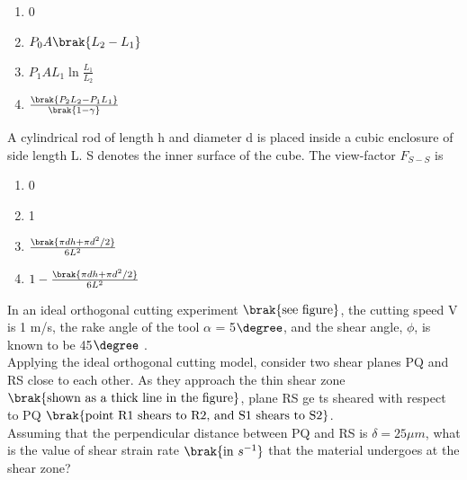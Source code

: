 		\begin{enumerate}
			\item 0
			\item $P_0A\brak{L_2 - L_1}$
			\item $P_1AL_1\ln\frac{L_1}{L_2}$
			\item $\frac{\brak{P_2L_2 - P_1L_1}}{\brak{1 - \gamma}}$
		\end{enumerate}
\item A cylindrical rod of length h and diameter d is placed inside a cubic enclosure of side length L. S denotes the inner surface of the cube. The view-factor $F_{S-S}$ is
	\begin{enumerate}
                \item 0
                \item 1
		\item $\frac{\brak{\pi dh + \pi d^2/2}}{6L^2}$
                \item $1 - \frac{\brak{\pi dh + \pi d^2/2}}{6L^2}$
	\end{enumerate}
\item In an ideal orthogonal cutting experiment $\brak{\text{see figure}}$, the cutting speed V is 1 m/s, the rake angle of the tool $\alpha$ = 5$\degree$, and the shear angle, $\phi$, is known to be 45$\degree$
	. \\
	Applying the ideal orthogonal cutting model, consider two shear planes PQ and RS close to each other. As they approach the thin shear zone $\brak{\text{shown as a thick line in the figure}}$, plane RS ge
	ts sheared with respect to PQ $\brak{\text{point R1 shears to R2, and S1 shears to S2}}$. \\
	Assuming that the perpendicular distance between PQ and RS is $\delta = 25 \mu m$, what is the value of shear strain rate $\brak{\text{in } s^{-1}}$ that the material undergoes at the shear zone?
